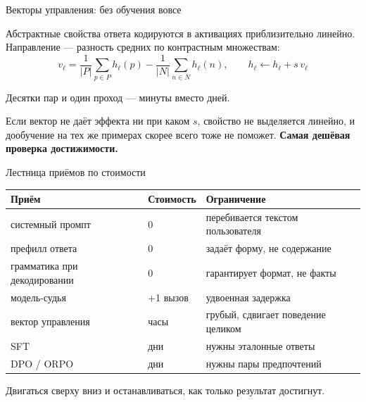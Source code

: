 \documentclass[11pt,aspectratio=169]{beamer}
\newcommand{\key}[1]{%
  \begin{center}\colorbox{boxbg}{\parbox{0.92\textwidth}{\vspace{2pt}#1\vspace{2pt}}}\end{center}}
\begin{document}
\begin{frame}{Векторы управления: без обучения вовсе}

Абстрактные свойства ответа кодируются в активациях приблизительно
линейно. Направление — разность средних по контрастным множествам:
\[
v_\ell = \frac{1}{|P|}\sum_{p\in P} h_\ell(p)
- \frac{1}{|N|}\sum_{n\in N} h_\ell(n),
\qquad
h_\ell \leftarrow h_\ell + s\,v_\ell
\]

\vspace{0.5em}
Десятки пар и один проход — минуты вместо дней.

\vspace{0.8em}
\key{Если вектор не даёт эффекта ни при каком $s$, свойство не
выделяется линейно, и дообучение на тех же примерах скорее всего тоже
не поможет. \textbf{Самая дешёвая проверка достижимости.}}

\end{frame}

\begin{frame}{Лестница приёмов по стоимости}

\begin{center}
\small
\begin{tabular}{@{}llp{6.2cm}@{}}
\toprule
\textbf{Приём} & \textbf{Стоимость} & \textbf{Ограничение} \\
\midrule
системный промпт & 0 & перебивается текстом пользователя \\
префилл ответа & 0 & задаёт форму, не содержание \\
грамматика при декодировании & 0 & гарантирует формат, не факты \\
модель-судья & +1 вызов & удвоенная задержка \\
вектор управления & часы & грубый, сдвигает поведение целиком \\
SFT & дни & нужны эталонные ответы \\
DPO / ORPO & дни & нужны пары предпочтений \\
\bottomrule
\end{tabular}
\end{center}

\vspace{1em}
\key{Двигаться сверху вниз и останавливаться, как только результат
достигнут.}

\end{frame}
\end{document}
